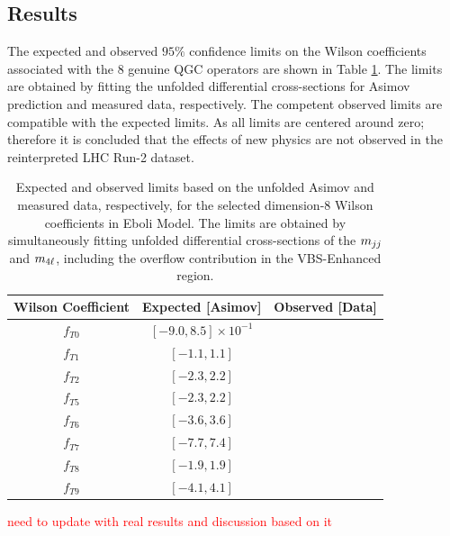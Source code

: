 \subsection{Results}
\label{subsec:EFT_Results}
The expected and observed $95\%$ confidence limits on the Wilson coefficients associated with the $8$ genuine QGC operators are shown in Table \ref{tab:twoobsofeboli}. The limits are obtained by fitting the unfolded differential cross-sections for Asimov prediction and measured data, respectively. The competent observed limits are compatible with the expected limits. As all limits are centered around zero; therefore it is concluded that the effects of new physics are not observed in the reinterpreted LHC Run-2 dataset.

\begin{table}[ht]
    \centering
    \caption{Expected and observed limits based on the unfolded Asimov and measured data, respectively, for the selected dimension-8 Wilson coefficients in Eboli Model. The limits are obtained by simultaneously fitting unfolded differential cross-sections of the $m_{jj}$ and $m_{4\ell}$, including the overflow contribution in the VBS-Enhanced region. \label{tab:twoobsofeboli}}
    \begin{tabular}{| c | c | c |}
        \hline
        Wilson Coefficient &    Expected [Asimov]  & Observed [Data]         \\
        \hline\hline
        $f_{T0}$ &  $[-9.0, 8.5]\times 10^{-1}$  & \\
        $f_{T1}$ &  $[-1.1, 1.1]$ &  \\
        $f_{T2}$ &  $[-2.3, 2.2]$ &  \\
        $f_{T5}$ &  $[-2.3, 2.2]$ & \\
        $f_{T6}$ &  $[-3.6, 3.6]$ & \\
        $f_{T7}$ &  $[-7.7, 7.4]$ & \\
        $f_{T8}$ &  $[-1.9, 1.9]$ & \\
        $f_{T9}$ &  $[-4.1, 4.1]$ & \\                               
        \hline
    \end{tabular}
\end{table}
\textcolor{red}{need to update with real results and discussion based on it}